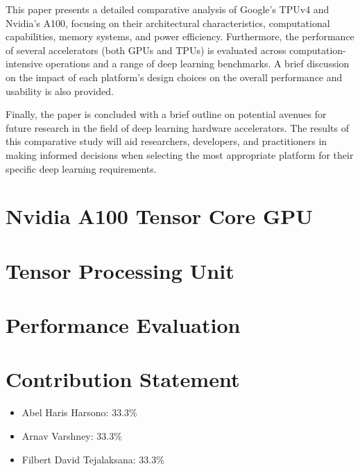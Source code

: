 \documentclass[conference]{IEEEtran}
\begin{document}
    This paper presents a detailed comparative analysis of Google's TPUv4 and Nvidia's A100, focusing on their architectural characteristics, computational capabilities, memory systems, and power efficiency.
    Furthermore, the performance of several accelerators (both GPUs and TPUs) is evaluated across computation-intensive operations and a range of deep learning benchmarks.
    A brief discussion on the impact of each platform's design choices on the overall performance and usability is also provided.

    Finally, the paper is concluded with a brief outline on potential avenues for future research in the field of deep learning hardware accelerators.
    The results of this comparative study will aid researchers, developers, and practitioners in making informed decisions when selecting the most appropriate platform for their specific deep learning requirements.


    \section{Nvidia A100 Tensor Core GPU}
    \label{sec:nvidia-a100-tensor-core-gpu}
    

    \section{Tensor Processing Unit}
    \label{sec:tensor-processing-unit}
    


    \section{Performance Evaluation}
    \label{sec:performance-evaluation}
    

    \section{Contribution Statement}
    \label{sec:contribution-statement}
    \begin{itemize}
        \item Abel Haris Harsono: 33.3\%
        \item Arnav Varshney: 33.3\%
        \item Filbert David Tejalaksana: 33.3\%
    \end{itemize}
\end{document}
